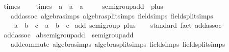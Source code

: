 \begin{isabellebody}
\isanewline
{}\isamarkupfalse%
\ times\ {\isacharequal}{\kern0pt}\isanewline
\ \ \ times\ {\isacharcolon}{\kern0pt}{\isacharcolon}{\kern0pt}\ {\isachardoublequoteopen}{\isacharprime}{\kern0pt}a\ {\isasymRightarrow}\ {\isacharprime}{\kern0pt}a\ {\isasymRightarrow}\ {\isacharprime}{\kern0pt}a{\isachardoublequoteclose}\ \ {\isacharparenleft}{\kern0pt}\ {\isachardoublequoteopen}{\isacharasterisk}{\kern0pt}{\isachardoublequoteclose}\ {}{}{\isacharparenright}{\kern0pt}%
\isadelimdocument
%
\endisadelimdocument
%
\isatagdocument
%
\isamarkuptrue%
%
\endisatagdocument
{\isafolddocument}%
%
\isadelimdocument
%
\endisadelimdocument
{}\isamarkupfalse%
\ semigroup{\isacharunderscore}{\kern0pt}add\ {\isacharequal}{\kern0pt}\ plus\ {\isacharplus}{\kern0pt}\isanewline
\ \ \ add{\isacharunderscore}{\kern0pt}assoc\ {\isacharbrackleft}{\kern0pt}algebra{\isacharunderscore}{\kern0pt}simps{\isacharcomma}{\kern0pt}\ algebra{\isacharunderscore}{\kern0pt}split{\isacharunderscore}{\kern0pt}simps{\isacharcomma}{\kern0pt}\ field{\isacharunderscore}{\kern0pt}simps{\isacharcomma}{\kern0pt}\ field{\isacharunderscore}{\kern0pt}split{\isacharunderscore}{\kern0pt}simps{\isacharbrackright}{\kern0pt}{\isacharcolon}{\kern0pt}\isanewline
\ \ \ \ {\isachardoublequoteopen}{\isacharparenleft}{\kern0pt}a\ {\isacharplus}{\kern0pt}\ b{\isacharparenright}{\kern0pt}\ {\isacharplus}{\kern0pt}\ c\ {\isacharequal}{\kern0pt}\ a\ {\isacharplus}{\kern0pt}\ {\isacharparenleft}{\kern0pt}b\ {\isacharplus}{\kern0pt}\ c{\isacharparenright}{\kern0pt}{\isachardoublequoteclose}\isanewline
{}\isanewline
\isanewline
{}\isamarkupfalse%
\ add{\isacharcolon}{\kern0pt}\ semigroup\ plus\isanewline
%
\isadelimproof
\ \ %
\endisadelimproof
%
\isatagproof
{}\isamarkupfalse%
\ standard\ {\isacharparenleft}{\kern0pt}fact\ add{\isacharunderscore}{\kern0pt}assoc{\isacharparenright}{\kern0pt}%
\endisatagproof
{\isafoldproof}%
%
\isadelimproof
\isanewline
%
\endisadelimproof
\isanewline
{}\isamarkupfalse%
\isanewline
\isanewline
{}\isamarkupfalse%
\ add{\isacharunderscore}{\kern0pt}assoc\isanewline
\isanewline
{}\isamarkupfalse%
\ ab{\isacharunderscore}{\kern0pt}semigroup{\isacharunderscore}{\kern0pt}add\ {\isacharequal}{\kern0pt}\ semigroup{\isacharunderscore}{\kern0pt}add\ {\isacharplus}{\kern0pt}\isanewline
\ \ \ add{\isacharunderscore}{\kern0pt}commute\ {\isacharbrackleft}{\kern0pt}algebra{\isacharunderscore}{\kern0pt}simps{\isacharcomma}{\kern0pt}\ algebra{\isacharunderscore}{\kern0pt}split{\isacharunderscore}{\kern0pt}simps{\isacharcomma}{\kern0pt}\ field{\isacharunderscore}{\kern0pt}simps{\isacharcomma}{\kern0pt}\ field{\isacharunderscore}{\kern0pt}split{\isacharunderscore}{\kern0pt}simps{\isacharbrackright}{\kern0pt}{\isacharcolon}{\kern0pt}\isanewline

\end{isabellebody}
